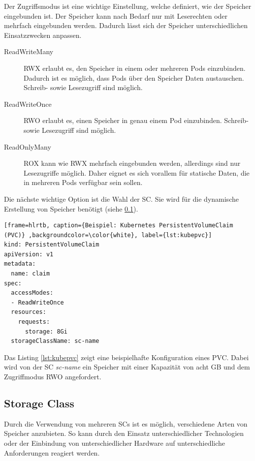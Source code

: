 Der Zugriffsmodus ist eine wichtige Einstellung, welche definiert, wie der Speicher eingebunden ist. Der Speicher kann nach Bedarf nur mit Leserechten oder mehrfach eingebunden werden. Dadurch lässt sich der Speicher unterschiedlichen Einsatzzwecken anpassen.
\begin{description}
\item[ReadWriteMany]
\ac{RWX} erlaubt es, den Speicher in einem oder mehreren Pods einzubinden. Dadurch ist es möglich, dass Pods über den Speicher Daten austauschen. Schreib- sowie Lesezugriff sind möglich.
\item[ReadWriteOnce]
\ac{RWO} erlaubt es, einen Speicher in genau einem Pod einzubinden. Schreib- sowie Lesezugriff sind möglich.
\item[ReadOnlyMany]
\ac{ROX} kann wie \ac{RWX} mehrfach eingebunden werden, allerdings sind nur Lesezugriffe möglich. Daher eignet es sich vorallem für statische Daten, die in mehreren Pods verfügbar sein sollen.
\end{description}
Die nächste wichtige Option ist die Wahl der \ac{SC}. Sie wird für die dynamische Erstellung von Speicher benötigt (siehe \ref{kube:sc}).
\lstset{language=yaml}
\begin{lstlisting}[frame=hlrtb, caption={Beispiel: Kubernetes PersistentVolumeClaim (PVC)} ,backgroundcolor=\color{white}, label={lst:kubepvc}]
kind: PersistentVolumeClaim
apiVersion: v1
metadata:
  name: claim
spec:
  accessModes:
  - ReadWriteOnce
  resources:
    requests:
      storage: 8Gi
  storageClassName: sc-name
\end{lstlisting}
Das Listing \ref{lst:kubepvc} zeigt eine beispielhafte Konfiguration eines \ac{PVC}. Dabei wird von der \ac{SC} \textit{sc-name} ein Speicher mit einer Kapazität von acht GB und dem Zugriffmodus \ac{RWO} angefordert.

\subsection{Storage Class}
\label{kube:sc}
Durch die Verwendung von mehreren \ac{SC}s ist es möglich, verschiedene Arten von Speicher anzubieten. So kann durch den Einsatz unterschiedlicher Technologien oder der Einbindung von unterschiedlicher Hardware auf unterschiedliche Anforderungen reagiert werden. \medskip

